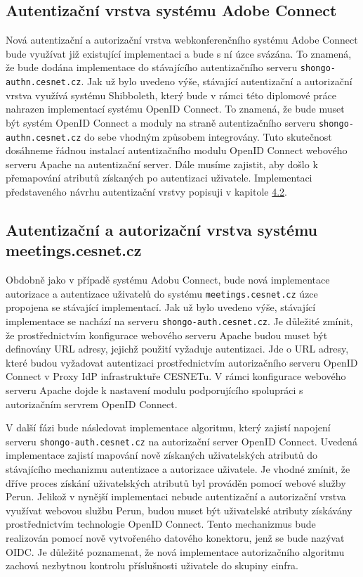 \documentclass[
  printed, %
  twoside, %
  table,   %
  nolof,     %
  nolot,     %
]{fithesis3}
\begin{document}
\subsection{Autentizační vrstva systému Adobe Connect}
Nová autentizační a autorizační vrstva webkonferenčního systému Adobe Connect bude využívat již existující implementaci a bude s ní úzce svázána. To znamená, že bude dodána implementace do stávajícího autentizačního serveru \texttt{shongo-authn.cesnet.cz}. Jak už bylo uvedeno výše, stávající autentizační a autorizační vrstva využívá systému Shibboleth, který bude v rámci této diplomové práce nahrazen implementací systému OpenID Connect. To znamená, že bude muset být systém OpenID Connect a moduly na straně autentizačního serveru \texttt{shongo-authn.cesnet.cz} do sebe vhodným způsobem integrovány. Tuto skutečnost dosáhneme řádnou instalací autentizačního modulu OpenID Connect webového serveru Apache na autentizační server. Dále musíme zajistit, aby došlo k přemapování atributů získaných po autentizaci uživatele. Implementaci představeného návrhu autentizační vrstvy popisuji v kapitole \hyperref[ACImpl]{4.2}. 

\subsection{Autentizační a autorizační vrstva systému meetings.cesnet.cz}
\label{shong-proposal}
Obdobně jako v případě systému Adobu Connect, bude nová implementace autorizace a autentizace uživatelů do systému \texttt{meetings.cesnet.cz} úzce propojena se stávající implementací. Jak už bylo uvedeno výše, stávající implementace se nachází na serveru \texttt{shongo-auth.cesnet.cz}. Je důležité zmínit, že prostřednictvím konfigurace webového serveru Apache budou muset být definovány URL adresy, jejichž použití vyžaduje autentizaci. Jde o URL adresy, které budou vyžadovat autentizaci prostřednictvím autorizačního serveru OpenID Connect v Proxy IdP infrastruktuře CESNETu. V rámci konfigurace webového serveru Apache dojde k nastavení modulu podporujícího spolupráci s autorizačním servrem OpenID Connect.  \par

V další fázi bude následovat implementace algoritmu, který zajistí napojení serveru \texttt{shongo-auth.cesnet.cz} na autorizační server OpenID Connect. Uvedená implementace zajistí mapování nově získaných uživatelských atributů do stávajícího mechanizmu autentizace a autorizace uživatele. Je vhodné zmínit, že dříve proces získání uživatelských atributů byl prováděn pomocí webové služby Perun. Jelikož v nynější implementaci nebude autentizační a autorizační vrstva využívat webovou službu Perun, budou muset být uživatelské atributy získávány prostřednictvím technologie OpenID Connect. Tento mechanizmus bude realizován pomocí nově vytvořeného datového konektoru, jenž se bude nazývat OIDC. Je důležité poznamenat, že nová implementace autorizačního algoritmu zachová nezbytnou kontrolu příslušnosti uživatele do skupiny einfra. 
\par
\end{document}
